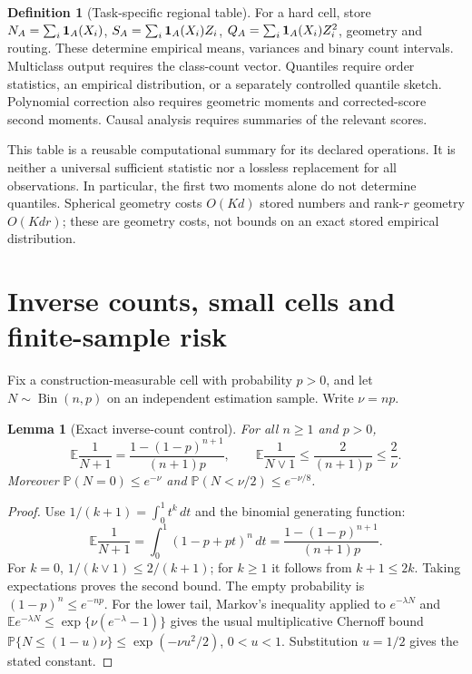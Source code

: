 \documentclass[11pt,a4paper]{article}
\newcommand{\E}{\mathbb E}\newcommand{\Pp}{\mathbb P}
\numberwithin{equation}{section}
\newtheorem{lemma}[theorem]{Lemma}
\theoremstyle{definition}\newtheorem{definition}[theorem]{Definition}
\theoremstyle{remark}\newtheorem{remark}[theorem]{Remark}
\begin{document}
\begin{definition}[Task-specific regional table]
For a hard cell, store $N_A=\sum_i\mathbf 1_A(X_i)$,
$S_A=\sum_i\mathbf 1_A(X_i)Z_i$, $Q_A=\sum_i\mathbf 1_A(X_i)Z_i^2$, geometry and routing. These determine empirical means, variances and binary count intervals. Multiclass output requires the class-count vector. Quantiles require order statistics, an empirical distribution, or a separately controlled quantile sketch. Polynomial correction also requires geometric moments and corrected-score second moments. Causal analysis requires summaries of the relevant scores.
\end{definition}
This table is a reusable computational summary for its declared operations. It is neither a universal sufficient statistic nor a lossless replacement for all observations. In particular, the first two moments alone do not determine quantiles. Spherical geometry costs $O(Kd)$ stored numbers and rank-$r$ geometry $O(Kdr)$; these are geometry costs, not bounds on an exact stored empirical distribution.

\section{Inverse counts, small cells and finite-sample risk}\label{sec:counts}
Fix a construction-measurable cell with probability $p>0$, and let $N\sim\operatorname{Bin}(n,p)$ on an independent estimation sample. Write $\nu=np$.

\begin{lemma}[Exact inverse-count control]\label{lem:inverse}
For all $n\ge1$ and $p>0$,
\[
 \E\frac1{N+1}=\frac{1-(1-p)^{n+1}}{(n+1)p},\qquad
 \E\frac1{N\vee1}\le\frac{2}{(n+1)p}\le\frac2{\nu}.
\]
Moreover $\Pp(N=0)\le e^{-\nu}$ and
$\Pp(N<\nu/2)\le e^{-\nu/8}$.
\end{lemma}
\begin{proof}
Use $1/(k+1)=\int_0^1t^k\,dt$ and the binomial generating function:
\[
 \E\frac1{N+1}=\int_0^1(1-p+pt)^n\,dt
 =\frac{1-(1-p)^{n+1}}{(n+1)p}.
\]
For $k=0$, $1/(k\vee1)\le2/(k+1)$; for $k\ge1$ it follows from $k+1\le2k$. Taking expectations proves the second bound. The empty probability is $(1-p)^n\le e^{-np}$. For the lower tail, Markov's inequality applied to $e^{-\lambda N}$ and
$\E e^{-\lambda N}\le\exp\{\nu(e^{-\lambda}-1)\}$ gives the usual multiplicative Chernoff bound
$\Pp\{N\le(1-u)\nu\}\le\exp(-\nu u^2/2)$, $0<u<1$. Substitution $u=1/2$ gives the stated constant.
\end{proof}
\end{document}
